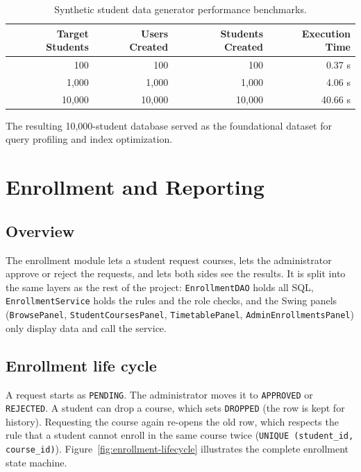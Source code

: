 \begin{table}[H]
\centering
\small
\begin{tabular}{|r|r|r|r|}
\hline
\textbf{Target Students} & \textbf{Users Created} & \textbf{Students Created} & \textbf{Execution Time} \\ \hline
100 & 100 & 100 & 0.37 s \\ \hline
1{,}000 & 1{,}000 & 1{,}000 & 4.06 s \\ \hline
10{,}000 & 10{,}000 & 10{,}000 & 40.66 s \\ \hline
\end{tabular}
\caption{Synthetic student data generator performance benchmarks.}
\label{tab:generator-benchmark}
\end{table}

The resulting 10{,}000-student database served as the foundational dataset for query profiling and index optimization.

\section{Enrollment and Reporting}
\label{sec:enrollment-reporting}

\subsection{Overview}
The enrollment module lets a student request courses, lets the administrator approve or reject the
requests, and lets both sides see the results. It is split into the same layers as the rest of the
project: \texttt{EnrollmentDAO} holds all SQL, \texttt{EnrollmentService} holds the rules and the role
checks, and the Swing panels (\texttt{BrowsePanel}, \texttt{StudentCoursesPanel}, \texttt{TimetablePanel},
\texttt{AdminEnrollmentsPanel}) only display data and call the service.

\subsection{Enrollment life cycle}
A request starts as \texttt{PENDING}. The administrator moves it to \texttt{APPROVED} or
\texttt{REJECTED}. A student can drop a course, which sets \texttt{DROPPED} (the row is kept for history).
Requesting the course again re-opens the old row, which respects the rule that a student cannot enroll in
the same course twice (\texttt{UNIQUE (student\_id, course\_id)}). Figure~\ref{fig:enrollment-lifecycle} illustrates the complete enrollment state machine.

